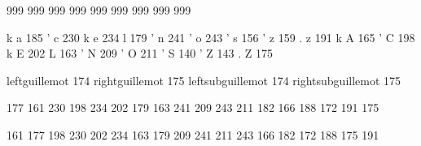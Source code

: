 \stopmapping 

\startmapping[pl1]

 999  %
 999  %
 999  %
 999  %
 999  %
 999  %
 999  %
 999  %
 999  %

\stopmapping 

\startencoding[pl1]

  k a 185  %
  ' c 230  %
  k e 234  %
 l 179  %
  ' n 241  %
  ' o 243  %
  ' s 156  %
  ' z 159  %
  . z 191  %
  k A 165  %
  ' C 198  %
  k E 202  %
 L 163  %
  ' N 209  %
  ' O 211  %
  ' S 140  %
  ' Z 143  %
  . Z 175  %

\stopencoding 

\startencoding[pl1]

 leftguillemot      174  %
 rightguillemot     175  %
 leftsubguillemot   174  %
 rightsubguillemot  175  %

\stopencoding


\startmapping[pl2]

 177 161  %
 230 198  %
 234 202  %
 179 163  %
 241 209  %
 243 211  %
 182 166  %
 188 172  %
 191 175  %

 161 177  %
 198 230  %
 202 234  %
 163 179  %
 209 241  %
 211 243  %
 166 182  %
 172 188  %
 175 191  %

\stopmapping 

